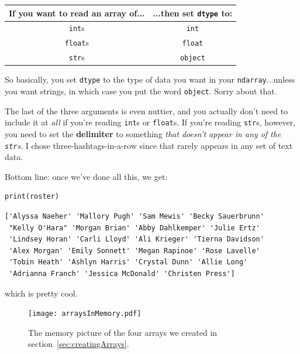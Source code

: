 \label{dtypeRules}
\begin{center}
\begin{tabular}{c|c}
If you want to read an array of... & ...then set \texttt{dtype} to: \\
\hline
\texttt{int}s & \texttt{int} \\
\texttt{float}s & \texttt{float} \\
\texttt{str}s & \texttt{object} \\
\end{tabular}
\end{center}

So basically, you set \texttt{dtype} to the type of data you want in your
\texttt{ndarray}...unless you want strings, in which case you put the word
\texttt{object}. Sorry about that.


The last of the three arguments is even nuttier, and you actually don't need to
include it at \textit{all} if you're reading \texttt{int}s or \texttt{float}s.
If you're reading \texttt{str}s, however, you need to set the
\textbf{delimiter} to something \textit{that doesn't appear in any of the
\texttt{str}s}. I chose three-hashtags-in-a-row since that rarely appears in
any set of text data.

Bottom line: once we've done all this, we get:

\begin{Verbatim}[fontsize=\small,samepage=true,frame=single,framesep=3mm]
print(roster)
\end{Verbatim}

\vspace{-.25in}
\label{rosterNames}
\begin{Verbatim}[fontsize=\footnotesize,samepage=true,frame=leftline,framesep=5mm,framerule=1mm]
['Alyssa Naeher' 'Mallory Pugh' 'Sam Mewis' 'Becky Sauerbrunn'
 "Kelly O'Hara" 'Morgan Brian' 'Abby Dahlkemper' 'Julie Ertz'
 'Lindsey Horan' 'Carli Lloyd' 'Ali Krieger' 'Tierna Davidson'
 'Alex Morgan' 'Emily Sonnett' 'Megan Rapinoe' 'Rose Lavelle'
 'Tobin Heath' 'Ashlyn Harris' 'Crystal Dunn' 'Allie Long'
 'Adrianna Franch' 'Jessica McDonald' 'Christen Press']
\end{Verbatim}

which is pretty cool.

\begin{figure}[ht]
\centering
\texttt{[image: arraysInMemory.pdf]}
\caption{The memory picture of the four arrays we created in
section~\ref{sec:creatingArrays}.}
\label{fig:arraysInMemory}
\end{figure}
